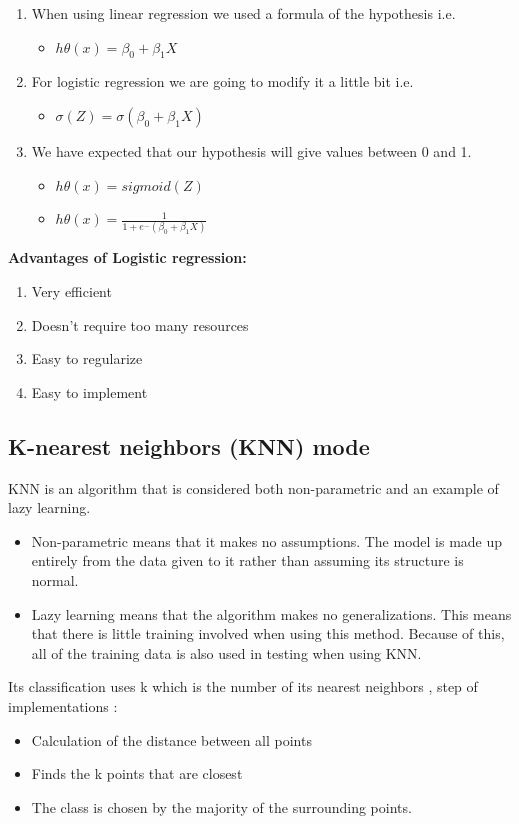 \documentclass[a4paper, 11pt, oneside]{article} %
\begin{document}
\begin{enumerate}
\item When using linear regression we used a formula of the hypothesis i.e.
\begin{itemize}
\item $h{\theta(x)} = \beta_ {0}  + \beta_{1} X$
\end{itemize}
\item For logistic regression we are going to modify it a little bit i.e.
\begin {itemize}
\item $\sigma(Z) = \sigma(\beta_{0} +\beta_{1}X)$
\end{itemize}

\item We have expected that our hypothesis will give values between 0 and 1.
\begin{itemize}

\item $h{\theta(x)} = sigmoid(Z)$
\item $h{\theta(x)} = \frac {1}{1 + e ^- { (\beta_{0}+ \beta_{1}X)}}$
\end{itemize}
\end{enumerate}

 \textbf {Advantages of Logistic regression:  }   
\begin{enumerate}
\item Very efficient
\item Doesn’t require too many resources
\item Easy to regularize
\item Easy to implement
\end{enumerate}
\subsection{K-nearest neighbors (KNN) mode}  
KNN is an algorithm that is considered both non-parametric and an example of lazy learning.\cite{towardsdatascience2} 
\begin{itemize}
\item Non-parametric means that it makes no assumptions. The model is made up entirely from the data given to it rather than assuming its structure is normal.
\item Lazy learning means that the algorithm makes no generalizations. This means that there is little training involved when using this method. Because of this, all of the training data is also used in testing when using KNN.
\end{itemize}
 Its classification uses k which is the number of its nearest neighbors , step of implementations :
\begin{itemize}
\item Calculation of the distance between all points
\item Finds the k points that are closest
\item The class is chosen by the majority of the surrounding points.
\end{itemize}
\end{document}
